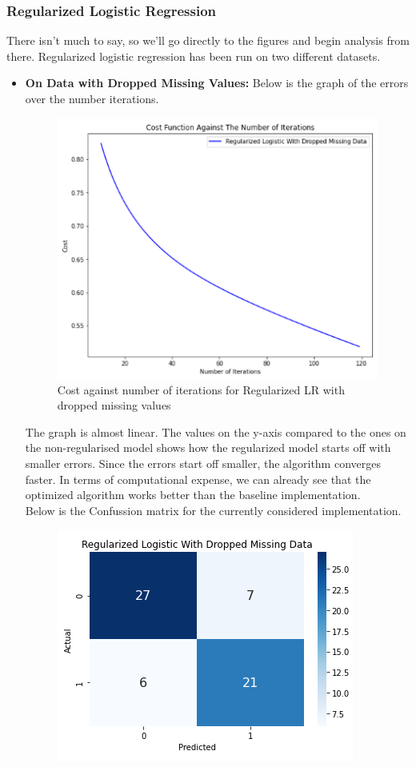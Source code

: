 \subsubsection{Regularized Logistic Regression}

There isn't much to say, so we'll go directly to the figures and begin analysis from there. Regularized logistic regression has been run on two different datasets.
\begin{itemize}
    \item \textbf{On Data with Dropped Missing Values:} Below is the graph of the errors over the number iterations.
    \begin{figure}[H]
        \begin{center}
            \includegraphics[scale=0.6]{Images/RD_C.png}
        \end{center}
        \caption{Cost against number of iterations for Regularized LR with dropped missing values}
    \end{figure}
    The graph is almost linear. The values on the y-axis compared to the ones on the non-regularised model shows how the regularized model starts off with smaller errors. Since the errors start off smaller, the algorithm converges faster. In terms of computational expense, we can already see that the optimized algorithm works better than the baseline implementation.\\
    Below is the Confussion matrix for the currently considered implementation.
    \begin{figure}[H]
        \begin{center}
            \includegraphics[scale=0.6]{Images/RD_CM.png}

\end{center}
\end{figure}
\end{itemize}
